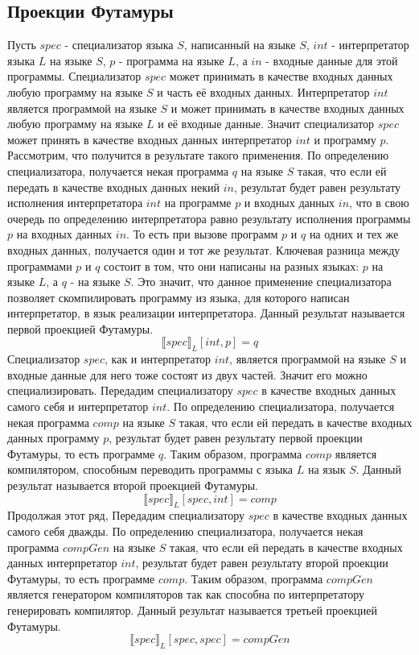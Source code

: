 \subsection{ Проекции Футамуры}
Пусть $spec$ - специализатор языка $S$, написанный на языке $S$, $int$ - интерпретатор языка $L$ на языке $S$, $p$ - программа на языке $L$, а $in$ - входные данные для этой программы. Специализатор $spec$ может принимать в качестве входных данных любую программу на языке $S$ и часть её входных данных. Интерпретатор $int$ является программой на языке $S$ и может принимать в качестве входных данных любую программу на языке $L$ и её входные данные. Значит специализатор $spec$ может принять в качестве входных данных интерпретатор $int$ и программу $p$. Рассмотрим, что получится в результате такого применения. По определению специализатора, получается некая программа $q$ на языке $S$ такая, что если ей передать в качестве входных данных некий $in$, результат будет равен результату исполнения интерпретатора $int$ на программе $p$ и входных данных $in$, что в свою очередь по определению интерпретатора равно результату исполнения программы $p$ на входных данных $in$. То есть при вызове программ $p$ и $q$ на одних и тех же входных данных, получается один и тот же результат. Ключевая разница между программами $p$ и $q$ состоит в том, что они написаны на разных языках: $p$ на языке $L$, а $q$ - на языке $S$. Это значит, что данное применение специализатора позволяет скомпилировать программу из языка, для которого написан интерпретатор, в язык реализации интерпретатора. Данный результат называется первой проекцией Футамуры.
    $$
        \llbracket spec \rrbracket_L [int, p] = q
    $$
Специализатор $spec$, как и интерпретатор $int$, является программой на языке $S$ и входные данные для него тоже состоят из двух частей. Значит его можно специализировать. Передадим специализатору $spec$ в качестве входных данных самого себя и интерпретатор $int$. По определению специализатора, получается некая программа $comp$ на языке $S$ такая, что если ей передать в качестве входных данных программу $p$, результат будет равен результату первой проекции Футамуры, то есть программе $q$. Таким образом, программа $comp$ является компилятором, способным переводить программы с языка $L$ на язык $S$. Данный результат называется второй проекцией Футамуры.
    $$
        \llbracket spec \rrbracket_L [spec, int] = comp
    $$
Продолжая этот ряд, Передадим специализатору $spec$ в качестве входных данных самого себя дважды. По определению специализатора, получается некая программа $compGen$ на языке $S$ такая, что если ей передать в качестве входных данных интерпретатор $int$, результат будет равен результату второй проекции Футамуры, то есть программе $comp$. Таким образом, программа $compGen$ является генератором компиляторов так как способна по интерпретатору генерировать компилятор. Данный результат называется третьей проекцией Футамуры. 
    $$
        \llbracket spec \rrbracket_L [spec, spec] = compGen
    $$

